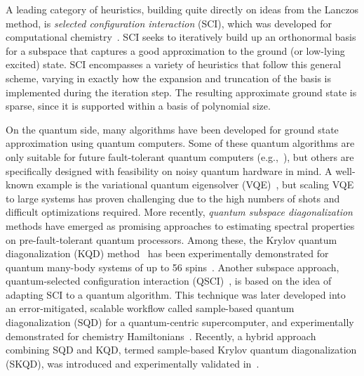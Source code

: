 \documentclass[
  reprint,            %
  amsmath,amssymb,
  aps,
  superscriptaddress, %
  longbibliography
]{revtex4-2}
\theoremstyle{definition}
\begin{document}
A leading category of heuristics, building quite directly on ideas from the Lanczos method, is \emph{selected configuration interaction} (SCI), which was developed for computational chemistry~\cite{Huron_1973_CIPSI,tubman2016deterministic_SCI,holmes2016heat_SCI,holmes2016efficient_SCI,sharma2017semistochastic_SCI,zhang2025TrimCI_SCI}.
SCI seeks to iteratively build up an orthonormal basis for a subspace that captures a good approximation to the ground (or low-lying excited) state.
SCI encompasses a variety of heuristics that follow this general scheme, varying in exactly how the expansion and truncation of the basis is implemented during the iteration step.
The resulting approximate ground state is sparse, since it is supported within a basis of polynomial size.

On the quantum side, many algorithms have been developed for ground state approximation using quantum computers.
Some of these quantum algorithms are only suitable for future fault-tolerant quantum computers (e.g.,~\cite{kitaev1995quantum,lin2022heisenberglimited,dong2022groundstate,ding2023even,wang2023quantumalgorithm}), but others are specifically designed with feasibility on noisy quantum hardware in mind.
A well-known example is the variational quantum eigensolver (VQE)~\cite{peruzzo2014variational}, but scaling VQE to large systems has proven challenging due to the high numbers of shots and difficult optimizations required.
More recently, \emph{quantum subspace diagonalization} methods have emerged as promising approaches to estimating spectral properties on pre-fault-tolerant quantum processors.
Among these, the Krylov quantum diagonalization (KQD) method~\cite{parrish2019quantum} has been experimentally demonstrated for quantum many-body systems of up to 56 spins~\cite{yoshioka2024diagonalization}.
Another subspace approach, quantum-selected configuration interaction (QSCI)~\cite{kanno2023quantum}, is based on the idea of adapting SCI to a quantum algorithm.
This technique was later developed into an error-mitigated, scalable workflow called sample-based quantum diagonalization (SQD) for a quantum-centric supercomputer, and experimentally demonstrated for chemistry Hamiltonians~\cite{robledomoreno2024chemistry, Liepuoniute2025_SQD, shajan2025towards_SQD, shajan2025proteins_SQD, barison2025quantum_SQD, kaliakin2024accurate_SQD, piccinelli2025SQDRIFT_SQD, shirakawa2025closedloop_SQD, sriluckshmy2025ghostgutzwiller_SQD, smith2025quantumcentricsimulationhydrogenabstraction_SQD, Danilov2025_sqd, D5CP02202A_SQD}.
Recently, a hybrid approach combining SQD and KQD, termed sample-based Krylov quantum diagonalization (SKQD), was introduced and experimentally validated in~\cite{yu2025quantum}. 
\end{document}
